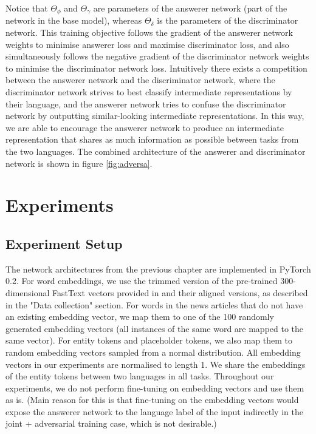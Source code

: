 \documentclass[]{article}
\begin{document}
Notice that $\Theta_\phi$ and $\Theta_\gamma$ are parameters of the answerer network (part of the network in the base model), whereas $\Theta_\delta$ is the parameters of the discriminator network. This training objective follows the gradient of the answerer network weights to minimise answerer loss and maximise discriminator loss, and also simultaneously follows the negative gradient of the discriminator network weights to minimise the discriminator network loss. Intuitively there exists a competition between the answerer network and the discriminator network, where the discriminator network strives to best classify intermediate representations by their language, and the answerer network tries to confuse the discriminator network by outputting similar-looking intermediate representations. In this way, we are able to encourage the answerer network to produce an intermediate representation that shares as much information as possible between tasks from the two languages. The combined architecture of the answerer and discriminator network is shown in figure \ref{fig:adversa}.

\section{Experiments}

\subsection{Experiment Setup}

The network architectures from the previous chapter are implemented in PyTorch 0.2. For word embeddings, we use the trimmed version of the pre-trained 300-dimensional FastText vectors provided in \cite{bojanowski2016enriching} and their aligned versions, as described in the "Data collection" section. For words in the news articles that do not have an existing embedding vector, we map them to one of the 100 randomly generated embedding vectors (all instances of the same word are mapped to the same vector). For entity tokens and placeholder tokens, we also map them to random embedding vectors sampled from a normal distribution. All embedding vectors in our experiments are normalised to length 1. We share the embeddings of the entity tokens between two languages in all tasks. Throughout our experiments, we do not perform fine-tuning on embedding vectors and use them as is. (Main reason for this is that fine-tuning on the embedding vectors would expose the answerer network to the language label of the input indirectly in the joint + adversarial training case, which is not desirable.)
\end{document}

